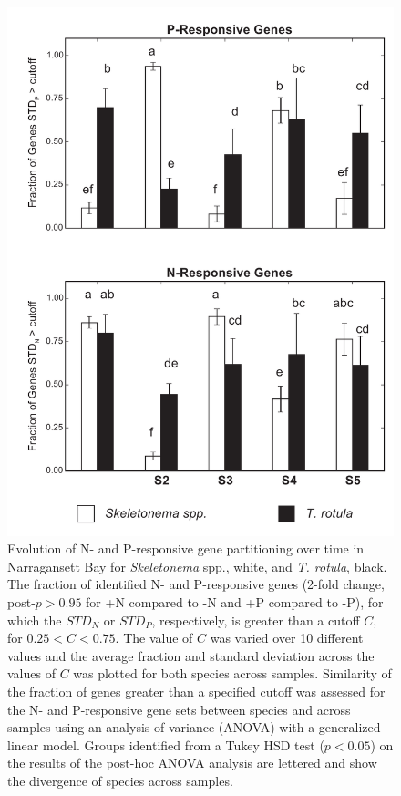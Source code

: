 \begin{figure}[p!]
  \centering
    \includegraphics[width=.6\textwidth]{Images/C3_Figure5_STDNP_Percents.pdf}

 \caption[Evolution of N- and P-responsive gene partitioning over time in Narragansett Bay]{Evolution of N- and P-responsive gene partitioning over time in Narragansett Bay for \textit{Skeletonema} spp., white, and \textit{T. rotula}, black. The fraction of identified N- and P-responsive genes (2-fold change, post-$p > 0.95$ for +N compared to -N and +P compared to -P), for which the $STD_N$ or $STD_P$, respectively, is greater than a cutoff $C$, for $0.25 < C < 0.75$. The value of $C$ was varied over 10 different values and the average fraction and standard deviation across the values of $C$ was plotted for both species across samples.  Similarity of the fraction of genes greater than a specified cutoff was assessed for the N- and P-responsive gene sets between species and across samples using an analysis of variance (ANOVA) with a generalized linear model. Groups identified from a Tukey HSD test ($p < 0.05$) on the results of the post-hoc ANOVA analysis are lettered and show the divergence of species across samples.}

  \label{fig:c3f5}
\end{figure}




